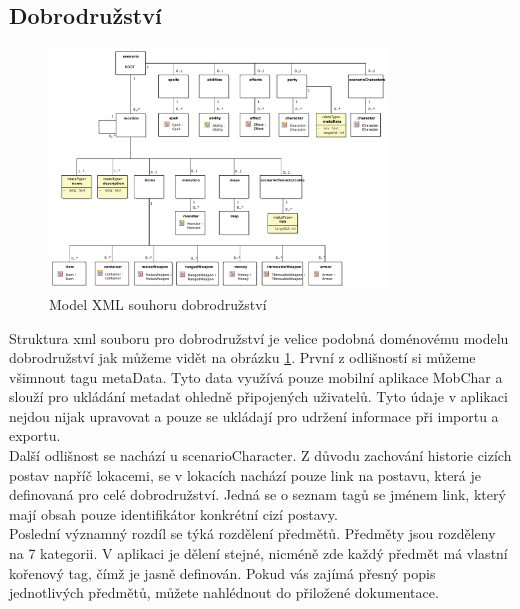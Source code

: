 \documentclass[thesis=B,czech]{resources/FITthesis}[2012/06/26]
\begin{document}
\subsection{Dobrodružství}
\begin{figure}\centering
	\includegraphics[width=0.8\textwidth]{images/scenarioXML}
	\caption[Model XML souhoru dobrodružství]{Model XML souhoru dobrodružství}\label{fig:xml_scenario}
\end{figure}
Struktura xml souboru pro dobrodružství je velice podobná doménovému modelu dobrodružství jak můžeme vidět na obrázku \ref{fig:xml_scenario}. První z odlišností si můžeme všimnout tagu \clqq metaData\crqq . Tyto data využívá pouze mobilní aplikace MobChar a slouží pro ukládání metadat ohledně připojených uživatelů. Tyto údaje v aplikaci nejdou nijak upravovat a pouze se ukládají pro udržení informace při importu a exportu. \\
Další odlišnost se nachází u \clqq scenarioCharacter\crqq . Z důvodu zachování historie cizích postav napříč lokacemi, se v lokacích nachází pouze link na postavu, která je definovaná pro celé dobrodružství. Jedná se o seznam tagů se jménem link, který mají obsah pouze identifikátor konkrétní cizí postavy. \\
Poslední významný rozdíl se týká rozdělení předmětů. Předměty jsou rozděleny na 7 kategorii. V aplikaci je dělení stejné, nicméně zde každý předmět má vlastní kořenový tag, čímž je jasně definován. Pokud vás zajímá přesný popis jednotlivých předmětů, můžete nahlédnout do přiložené dokumentace. \\
\end{document}
